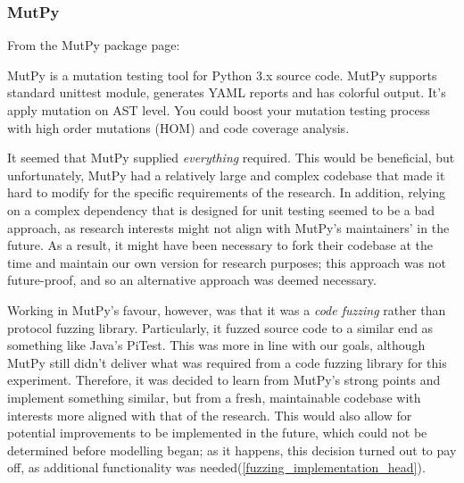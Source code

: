 \subsubsection{MutPy} %
\label{fuzzing_mutpy}
From the MutPy package page\cite{MutPy26:online}: 
\begin{displayquote}
MutPy is a mutation testing tool for Python 3.x source code. MutPy supports standard unittest module, generates YAML reports and has colorful output. It’s apply mutation on AST level. You could boost your mutation testing process with high order mutations (HOM) and code coverage analysis.
\end{displayquote}\par

It seemed that MutPy supplied \emph{everything} required. This would be beneficial, but unfortunately, MutPy had a relatively large and complex codebase\cite{khala8:online} that made it hard to modify for the specific requirements of the research. In addition, relying on a complex dependency that is designed for unit testing seemed to be a bad approach, as research interests might not align with MutPy's maintainers' in the future. As a result, it might have been necessary to fork their codebase at the time and maintain our own version for research purposes; this approach was not future-proof, and so an alternative approach was deemed necessary. \par

Working in MutPy's favour, however, was that it was a \emph{code fuzzing} rather than protocol fuzzing library. Particularly, it fuzzed source code to a similar end as something like Java's PiTest\cite{PITMu92:online}. This was more in line with our goals, although MutPy still didn't deliver what was required from a code fuzzing library for this experiment. Therefore, it was decided to learn from MutPy's strong points and implement something similar, but from a fresh, maintainable codebase with interests more aligned with that of the research. This would also allow for potential improvements to be implemented in the future, which could not be determined before modelling began; as it happens, this decision turned out to pay off, as additional functionality was needed(\cref{fuzzing_implementation_head}). \par

